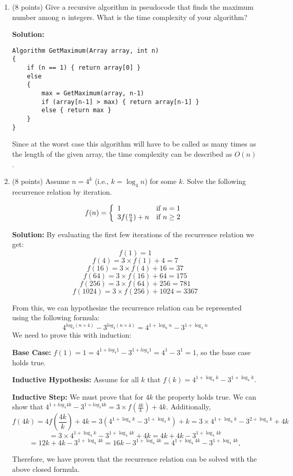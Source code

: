 \documentclass[11pt]{article}
\begin{document}
\begin{enumerate}
\item (8 points) 
Give a recursive algorithm in pseudocode that finds the maximum number among $n$ integers.
What is the time complexity of your algorithm? 

\textbf{Solution: }
\begin{verbatim}
Algorithm GetMaximum(Array array, int n)
{
    if (n == 1) { return array[0] }
    else
    {
        max = GetMaximum(array, n-1)
        if (array[n-1] > max) { return array[n-1] }
        else { return max }
    }
}
\end{verbatim}
Since at the worst case this algorithm will have to be called as many times as the length of the given array, the time complexity can be described as $O(n)$.  

\item (8 points) 
Assume $n=4^k$ (i.e., $k=\log_4 n$) for some $k$. 
Solve the following recurrence relation by iteration.

$$f(n)=\left\{\begin{array}{ll}
1&\mbox{if $n=1$}\\
3f({n\over4})+n&\mbox{if $n\ge2$}
\end{array}
\right.$$

\textbf{Solution: }
By evaluating the first few iterations of the recurrence relation we get:
$$ f(1) = 1 $$
$$ f(4) = 3 \times f(1) + 4 = 7 $$
$$ f(16) = 3 \times f(4) + 16 = 37 $$
$$ f(64) = 3 \times f(16) + 64 = 175 $$
$$ f(256) = 3 \times f(64) + 256 = 781 $$
$$ f(1024) = 3 \times f(256) + 1024 = 3367 $$

From this, we can hypothesize the recurrence relation can be represented using the following formula:
$$ 4^{log_4 (n \times 4)} - 3^{log_4 (n \times 4)} = 4^{1 + \log_4 n} - 3^{1 + \log_4 n} $$
We need to prove this with induction:

\textbf{Base Case: } $f(1) = 1 = 4^{1 + log_4 1} - 3^{1 + log_4 1} = 4^1 - 3^1 = 1$, so the base case holds true.  

\textbf{Inductive Hypothesis: } Assume for all $k$ that $f(k) = 4^{1 + \log_4 k} - 3^{1 + \log_4 k}$.  

\textbf{Inductive Step: } We must prove that for $4k$ the property holds true.  
We can show that $4^{1 + log_4 4k} - 3^{1 + log_4 4k} = 3 \times f(\frac{4k}{k}) + 4k$.  Additionally, 
$$ f(4k) = 4 f(\frac{4k}{k}) + 4k = 3 (4 ^{1 + \log_4 k} - 3^{1 + \log_4 k}) + k = 3 \times 4^{1 + \log_4 k} - 3^{2 + \log_4 k} + 4k $$
$$ = 3 \times 4^{1 + \log_4 k} - 3^{1 + \log_4 4k} + 4k = 4k + 4k - 3^{1 + \log_4 4k} $$
$$ = 12k + 4k - 3^{1 + \log_4 4k} = 16k - 3^{1 + \log_4 4k} = 4^{1 + \log_4 4k} - 3^{1 + \log_4 4k}, $$

Therefore, we have proven that the recurrence relation can be solved with the above closed formula.  

\end{enumerate}
\end{document}
